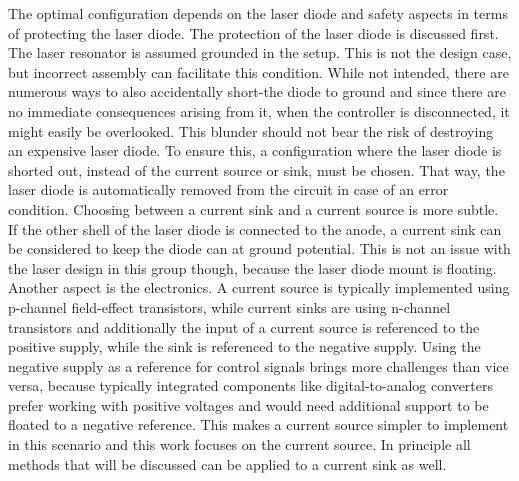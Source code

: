 The optimal configuration depends on the laser diode and safety aspects in terms of protecting the laser diode. The protection of the laser diode is discussed first. The laser resonator is assumed grounded in the setup. This is not the design case, but incorrect assembly can facilitate this condition. While not intended, there are numerous ways to also accidentally short-the diode to ground and since there are no immediate consequences arising from it, when the controller is disconnected, it might easily be overlooked. This blunder should not bear the risk of destroying an expensive laser diode. To ensure this, a configuration where the laser diode is shorted out, instead of the current source or sink, must be chosen. That way, the laser diode is automatically removed from the circuit in case of an error condition.
Choosing between a current sink and a current source is more subtle. If the other shell of the laser diode is connected to the anode, a current sink can be considered to keep the diode can at ground potential. This is not an issue with the laser design in this group though, because the laser diode mount is floating. Another aspect is the electronics. A current source is typically implemented using p-channel field-effect transistors, while current sinks are using n-channel transistors and additionally the input of a current source is referenced to the positive supply, while the sink is referenced to the negative supply. Using the negative supply as a reference for control signals brings more challenges than vice versa, because typically integrated components like digital-to-analog converters prefer working with positive voltages and would need additional support to be floated to a negative reference. This makes a current source simpler to implement in this scenario and this work focuses on the current source. In principle all methods that will be discussed can be applied to a current sink as well.

